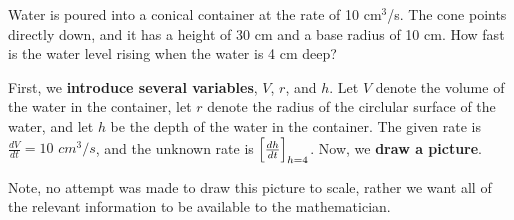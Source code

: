 \documentclass{ximera}
\begin{document}
\begin{example}
Water is poured into a conical container at the rate of 10
cm${}^3$/s.  The cone points directly down, and it has a height of
30 cm and a base radius of 10 cm.  How fast is the water level rising
when the water is 4 cm deep?

\begin{explanation}
First, we \textbf{introduce several variables}, $V$, $r$, and $h$. Let $V$ denote the volume of the water in the container, let $r$ denote the radius of the circlular surface of the water, and  let $h$ be the depth of the water in the container. The given rate is $\frac{dV}{dt}=10$ $cm^3/s$, and the unknown rate is $\Bigl[\frac{dh}{dt}\Bigr]_{h=4}$.
    Now, we \textbf{draw a picture}.
\begin{image}
\end{image}
Note, no attempt was made to draw this picture to scale, rather we
want all of the relevant information to be available to the
mathematician.


\end{explanation}
\end{example}
\end{document}
